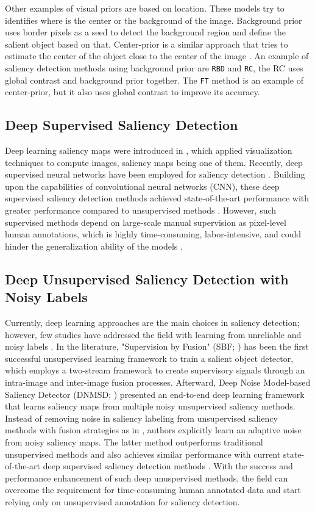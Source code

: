 \documentclass{article}
\begin{document}
Other examples of visual priors are based on location. These models try to identifies where is the center or the background of the image. Background prior uses border pixels as a seed to detect the background region and define the salient object based on that. Center-prior is a similar approach that tries to estimate the center of the object close to the center of the image \cite{ullah2020}. An example of saliency detection methods using background prior are \texttt{RBD} and \texttt{RC}, the RC uses global contrast and background prior together. The \texttt{FT} method is an example of center-prior, but it also uses global contrast to improve its accuracy.

\subsection{Deep Supervised Saliency Detection}

Deep learning saliency maps were introduced in \cite{symonyan2014}, which applied visualization techniques to compute images, saliency maps being one of them. Recently, deep supervised neural networks have been employed for saliency detection \cite{Li2015, Hou2016, ZhangP2017, Luo2017, Zhou2019}. Building upon the capabilities of convolutional neural networks (CNN), these deep supervised saliency detection methods achieved state-of-the-art performance with greater performance compared to unsupervised methods \cite{zhang2018}. However, such supervised methods depend on large-scale manual supervision as pixel-level human annotations, which is highly time-consuming, labor-intensive, and could hinder the generalization ability of the models \cite{zhang2018, zhang2014}. 

\subsection{Deep Unsupervised Saliency Detection with Noisy Labels}

Currently, deep learning approaches are the main choices in saliency detection; however, few studies have addressed the field with learning from unreliable and noisy labels \cite{zhang2017, zhang2018}. In the literature, "Supervision by Fusion" (SBF; \cite{zhang2017}) has been the first successful unsupervised learning framework to train a salient object detector, which employs a two-stream framework to create supervisory signals through an intra-image and inter-image fusion processes. Afterward, Deep Noise Model-based Saliency Detector (DNMSD; \cite{zhang2018}) presented an end-to-end deep learning framework that learns saliency maps from multiple noisy unsupervised saliency methods. Instead of removing noise in saliency labeling from unsupervised saliency methods with fusion strategies as in \cite{zhang2017}, authors explicitly learn an adaptive noise from noisy saliency maps. The latter method outperforms traditional unsupervised methods and also achieves similar performance with current state-of-the-art deep supervised saliency detection methods \cite{zhang2018}. With the success and performance enhancement of such deep unuspervised methods, the field can overcome the requirement for time-consuming human annotated data and start relying only on unsupervised annotation for saliency detection.
\end{document}
